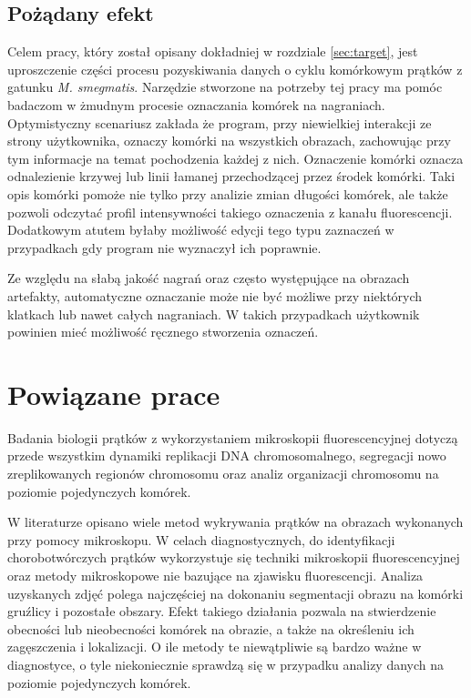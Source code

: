 \documentclass[declaration,shortabstract,mgr]{iithesis}
\begin{document}
\subsection{Pożądany efekt}

Celem pracy, który został opisany dokładniej w rozdziale \ref{sec:target}, jest uproszczenie części procesu pozyskiwania danych o cyklu komórkowym prątków z gatunku \emph{M. smegmatis}.
Narzędzie stworzone na potrzeby tej pracy ma pomóc badaczom w żmudnym procesie oznaczania komórek na nagraniach.
Optymistyczny scenariusz zakłada że program, przy niewielkiej interakcji ze strony użytkownika, oznaczy komórki na wszystkich obrazach, zachowując przy tym informacje na temat pochodzenia każdej z nich.
Oznaczenie komórki oznacza odnalezienie krzywej lub linii łamanej przechodzącej przez środek komórki.
Taki opis komórki pomoże nie tylko przy analizie zmian długości komórek, ale także pozwoli odczytać profil intensywności takiego oznaczenia z kanału fluorescencji.
Dodatkowym atutem byłaby możliwość edycji tego typu zaznaczeń w przypadkach gdy program nie wyznaczył ich poprawnie.

Ze względu na słabą jakość nagrań oraz często występujące na obrazach artefakty, automatyczne oznaczanie może nie być możliwe przy niektórych klatkach lub nawet całych nagraniach.
W takich przypadkach użytkownik powinien mieć możliwość ręcznego stworzenia oznaczeń.

\section{Powiązane prace}

Badania biologii prątków z wykorzystaniem mikroskopii fluorescencyjnej dotyczą przede wszystkim dynamiki replikacji DNA chromosomalnego, segregacji nowo zreplikowanych regionów chromosomu oraz analiz organizacji chromosomu na poziomie pojedynczych komórek\cite{paper:watching-dna-replication}\cite{paper:protein-responsibility}.

W literaturze opisano wiele metod wykrywania prątków na obrazach wykonanych przy pomocy mikroskopu.
W celach diagnostycznych, do identyfikacji chorobotwórczych prątków wykorzystuje się techniki mikroskopii fluorescencyjnej\cite{paper:detection-of-tb-with-ip} oraz metody mikroskopowe nie bazujące na zjawisku fluorescencji\cite{paper:ip-techniques-for-identifying-tb}.
Analiza uzyskanych zdjęć polega najczęściej na dokonaniu segmentacji obrazu na komórki gruźlicy i pozostałe obszary.
Efekt takiego działania pozwala na stwierdzenie obecności lub nieobecności komórek na obrazie, a także na określeniu ich zagęszczenia i lokalizacji.
O ile metody te niewątpliwie są bardzo ważne w diagnostyce, o tyle niekoniecznie sprawdzą się w przypadku analizy danych na poziomie pojedynczych komórek.
\end{document}
